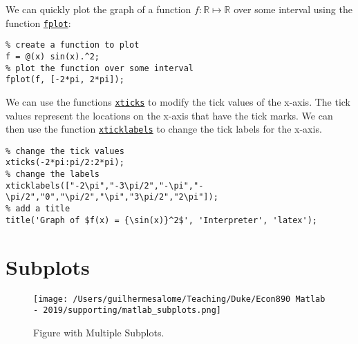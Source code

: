 \documentclass[12pt, a4paper]{article}
\begin{document}
We can quickly plot the graph of a function \(f:\mathbb{R}\mapsto\mathbb{R}\) over some interval using the function \href{https://www.mathworks.com/help/matlab/ref/fplot.html?s\_tid=doc\_ta}{\texttt{fplot}}:
\lstset{language=matlab,label= ,caption= ,captionpos=b,firstnumber=1,numbers=left,style=Matlab-editor}
\begin{lstlisting}
% create a function to plot
f = @(x) sin(x).^2;
% plot the function over some interval
fplot(f, [-2*pi, 2*pi]);
\end{lstlisting}
We can use the functions \href{https://www.mathworks.com/help/matlab/ref/xticks.html?s\_tid=doc\_ta}{\texttt{xticks}} to modify the tick values of the x-axis.
The tick values represent the locations on the x-axis that have the tick marks.
We can then use the function \href{https://www.mathworks.com/help/matlab/ref/xticklabels.html?s\_tid=doc\_ta}{\texttt{xticklabels}} to change the tick labels for the x-axis.
\lstset{language=matlab,label= ,caption= ,captionpos=b,firstnumber=1,numbers=left,style=Matlab-editor}
\begin{lstlisting}
% change the tick values
xticks(-2*pi:pi/2:2*pi);
% change the labels
xticklabels(["-2\pi","-3\pi/2","-\pi","-\pi/2","0","\pi/2","\pi","3\pi/2","2\pi"]);
% add a title
title('Graph of $f(x) = {\sin(x)}^2$', 'Interpreter', 'latex');
\end{lstlisting}
\section{Subplots}
\label{sec:orga0582fd}
\begin{figure}[H]
\centering
\texttt{[image: /Users/guilhermesalome/Teaching/Duke/Econ890 Matlab - 2019/supporting/matlab\_subplots.png]}
\caption{\label{fig:org1c31647}
Figure with Multiple Subplots.}
\end{figure}
\end{document}
